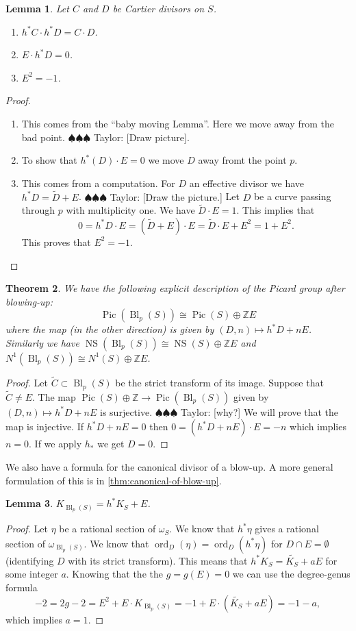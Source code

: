 \documentclass[12pt]{article}
\numberwithin{equation}{section}
\newtheorem{theorem}{Theorem}[subsection]
\newtheorem{lemma}[theorem]{Lemma}
\theoremstyle{definition}
\theoremstyle{remark}
\newcommand{\ZZ}{\mathbb{Z}}
\newcommand{\ord}{\operatorname{ord}}
\newcommand{\Pic}{\operatorname{Pic}}
\newcommand{\Bl}{\operatorname{Bl}}
\newcommand{\NS}{\operatorname{NS}}
\newcommand{\taylor}[1]{{\color{blue} \sf $\spadesuit\spadesuit\spadesuit$ Taylor: [#1]}}
\begin{document}
\begin{lemma}
	Let $C$ and $D$ be Cartier divisors on $S$.
	\begin{enumerate}
		\item $h^*C\cdot h^*D = C\cdot D$.
		\item $E\cdot h^*D=0$.
		\item $E^2=-1$.
	\end{enumerate}
\end{lemma}
\begin{proof}
	\begin{enumerate}
		\item This comes from the ``baby moving Lemma''. 
		Here we move away from the bad point. \taylor{Draw picture}.
		\item To show that $h^*(D)\cdot E=0$ we move $D$ away fromt the point $p$.
		\item This comes from a computation.
		For $D$ an effective divisor we have $h^*D = \widetilde{D}+E$. 
		\taylor{Draw the picture.}
		Let $D$ be a curve passing through $p$ with multiplicity one. 
		We have $\widetilde{D}\cdot E =1$. 
		This implies that 
		$$0 = h^*D \cdot E = (\widetilde{D}+E)\cdot E = \widetilde{D}\cdot E + E^2 = 1+E^2.$$
		This proves that $E^2=-1$.
	\end{enumerate}
\end{proof}

\begin{theorem}
	We have the following explicit description of the Picard group after blowing-up:
	$$\Pic(\Bl_p(S)) \cong \Pic(S) \oplus \ZZ E$$
	where the map (in the other direction) is given by $(D,n) \mapsto h^*D+nE$.
	Similarly we have $\NS(\Bl_p(S)) \cong \NS(S)\oplus \ZZ E$ and $N^1(\Bl_p(S)) \cong N^1(S)\oplus \ZZ E$.
\end{theorem}
\begin{proof}
	Let $\widetilde{C} \subset \Bl_p(S)$ be the strict transform of its image.
	Suppose that $\widetilde{C}\neq E$. 
	The map $\Pic(S)\oplus \ZZ \to \Pic(\Bl_p(S))$ given by $(D,n) \mapsto h^*D+nE$ is surjective. \taylor{why?}
	We will prove that the map is injective.
	If $h^*D+nE=0$ then 
	$0 = (h^*D+nE)\cdot E = -n$
	which implies $n=0$. 
	If we apply $h_*$ we get $D=0$.
\end{proof}

We also have a formula for the canonical divisor of a blow-up. 
A more general formulation of this is in \ref{thm:canonical-of-blow-up}.
\begin{lemma}\label{lem:canonical-of-blow-up}
	$K_{\Bl_p(S)}=h^*K_S + E$.
\end{lemma}
\begin{proof} 
	Let $\eta$ be a rational section of $\omega_S$. 
	We know that $h^*\eta$ gives a rational section of $\omega_{\Bl_p(S)}$. 
	We know that $\ord_D(\eta)=\ord_D(h^*\eta)$ for $D\cap E=\emptyset$ (identifying $D$ with its strict transform). 
	This means that $h^*K_S = \widetilde{K_S}+aE$ for some integer $a$. 
	Knowing that the the $g=g(E)=0$ we can use the degree-genus formula
	$$-2=2g-2=E^2 + E\cdot K_{\Bl_p(S)}= -1+E\cdot(\widetilde{K_S}+aE)=-1-a,$$
	which implies $a=1$.
\end{proof}
\end{document}
